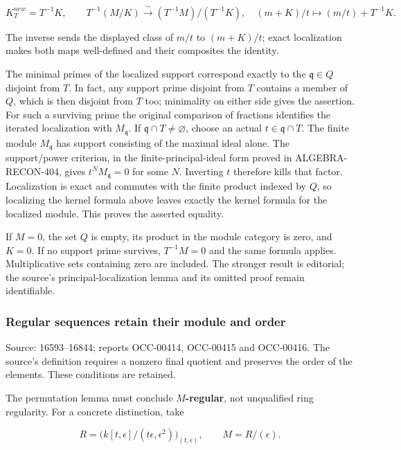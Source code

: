 \[
K_T^{new}=T^{-1}K,\qquad
T^{-1}(M/K)\xrightarrow{\;\sim\;}(T^{-1}M)/(T^{-1}K),
\quad (m+K)/t\longmapsto(m/t)+T^{-1}K.
\]

The inverse sends the displayed class of \(m/t\) to \((m+K)/t\); exact localization makes both maps well-defined and their composites the identity.

The minimal primes of the localized support correspond exactly to the \(\mathfrak q\in Q\) disjoint from \(T\). In fact, any support prime disjoint from \(T\) contains a member of \(Q\), which is then disjoint from \(T\) too; minimality on either side gives the assertion. For such a surviving prime the original comparison of fractions identifies the iterated localization with \(M_{\mathfrak q}\). If \(\mathfrak q\cap T\ne\varnothing\), choose an actual \(t\in\mathfrak q\cap T\). The finite module \(M_{\mathfrak q}\) has support consisting of the maximal ideal alone. The support/power criterion, in the finite-principal-ideal form proved in ALGEBRA-\AlgebraIdentifierBreak{}RECON-\AlgebraIdentifierBreak{}404, gives \(t^N M_{\mathfrak q}=0\) for some \(N\). Inverting \(t\) therefore kills that factor. Localization is exact and commutes with the finite product indexed by \(Q\), so localizing the kernel formula above leaves exactly the kernel formula for the localized module. This proves the asserted equality.

If \(M=0\), the set \(Q\) is empty, its product in the module category is zero, and \(K=0\). If no support prime survives, \(T^{-1}M=0\) and the same formula applies. Multiplicative sets containing zero are included. The stronger result is editorial; the source's principal-localization lemma and its omitted proof remain identifiable.

\subsubsection{Regular sequences retain their module and order}\label{algebra-proof-006-regular-sequences-retain-their-module-and-order}

Source: 16593--16844; reports OCC-00414, OCC-00415 and OCC-00416. The source's definition requires a nonzero final quotient and preserves the order of the elements. These conditions are retained.

The permutation lemma must conclude \textbf{\(M\)-regular}, not unqualified ring regularity. For a concrete distinction, take

\[
R=\bigl(k[t,\epsilon]/(t\epsilon,\epsilon^2)\bigr)_{(t,\epsilon)},
\qquad M=R/(\epsilon).
\]

